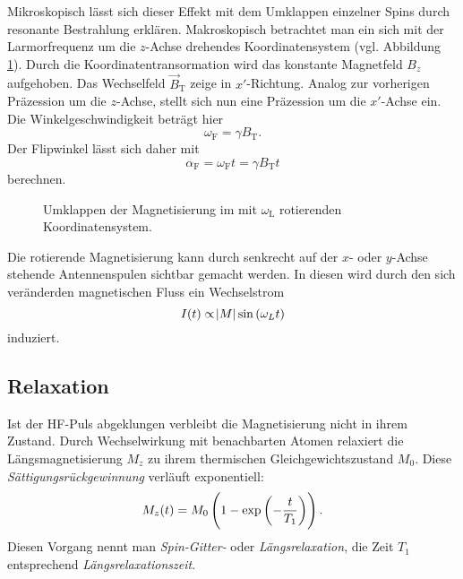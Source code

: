 \documentclass[
    11pt,
    ngerman
]{scrreprt}
\begin{document}
Mikroskopisch lässt sich dieser Effekt mit dem Umklappen einzelner Spins durch
resonante Bestrahlung erklären. Makroskopisch betrachtet man ein sich mit der
Larmorfrequenz um die $z$-Achse drehendes Koordinatensystem (vgl. Abbildung
\ref{fig:kernspinresonanz}). Durch die Koordinatentransormation wird das
konstante Magnetfeld $B_z$ aufgehoben. Das Wechselfeld $\vec B_\text{T}$ zeige
in $x'$-Richtung. Analog zur vorherigen Präzession um die $z$-Achse, stellt
sich nun eine Präzession um die $x'$-Achse ein. Die Winkelgeschwindigkeit
beträgt hier
\[
    \omega_\text{F} = \gamma B_\text{T}.
\]
Der Flipwinkel lässt sich daher mit
\[
    \alpha_\text{F} = \omega_\text{F} t = \gamma B_\text{T} t
\]
berechnen.

\begin{figure}
    \centering
    \caption{%
        Umklappen der Magnetisierung im mit $\omega_\text{L}$ rotierenden Koordinatensystem.
    }
    \label{fig:kernspinresonanz}
\end{figure}

Die rotierende Magnetisierung kann durch senkrecht auf der $x$- oder $y$-Achse stehende Antennenspulen sichtbar gemacht werden. In diesen wird durch den sich veränderden magnetischen Fluss ein Wechselstrom
\[
    I(t) \propto \abs{M} \sin\left({\omega_L t}\right)
\]
induziert.



    

\subsection{Relaxation}

Ist der HF-Puls abgeklungen verbleibt die Magnetisierung nicht in ihrem
Zustand. Durch Wechselwirkung mit benachbarten Atomen relaxiert die Längsmagnetisierung $M_z$ zu ihrem
thermischen Gleichgewichtszustand $M_0$. Diese \emph{Sättigungsrückgewinnung} verläuft exponentiell:
\[
    M_z(t) = M_0\del{1-\dexp{-\frac{t}{T_1}}}.
\]
Diesen Vorgang nennt man \emph{Spin-Gitter-} oder \emph{Längsrelaxation}, die
Zeit $T_1$ entsprechend \emph{Längsrelaxationszeit}.
\end{document}
